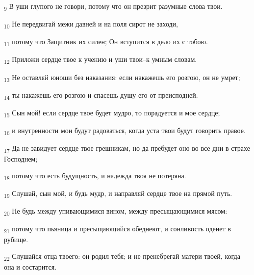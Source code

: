 \begin{tcolorbox}
\textsubscript{9} В уши глупого не говори, потому что он презрит разумные слова твои.
\end{tcolorbox}
\begin{tcolorbox}
\textsubscript{10} Не передвигай межи давней и на поля сирот не заходи,
\end{tcolorbox}
\begin{tcolorbox}
\textsubscript{11} потому что Защитник их силен; Он вступится в дело их с тобою.
\end{tcolorbox}
\begin{tcolorbox}
\textsubscript{12} Приложи сердце твое к учению и уши твои--к умным словам.
\end{tcolorbox}
\begin{tcolorbox}
\textsubscript{13} Не оставляй юноши без наказания: если накажешь его розгою, он не умрет;
\end{tcolorbox}
\begin{tcolorbox}
\textsubscript{14} ты накажешь его розгою и спасешь душу его от преисподней.
\end{tcolorbox}
\begin{tcolorbox}
\textsubscript{15} Сын мой! если сердце твое будет мудро, то порадуется и мое сердце;
\end{tcolorbox}
\begin{tcolorbox}
\textsubscript{16} и внутренности мои будут радоваться, когда уста твои будут говорить правое.
\end{tcolorbox}
\begin{tcolorbox}
\textsubscript{17} Да не завидует сердце твое грешникам, но да пребудет оно во все дни в страхе Господнем;
\end{tcolorbox}
\begin{tcolorbox}
\textsubscript{18} потому что есть будущность, и надежда твоя не потеряна.
\end{tcolorbox}
\begin{tcolorbox}
\textsubscript{19} Слушай, сын мой, и будь мудр, и направляй сердце твое на прямой путь.
\end{tcolorbox}
\begin{tcolorbox}
\textsubscript{20} Не будь между упивающимися вином, между пресыщающимися мясом:
\end{tcolorbox}
\begin{tcolorbox}
\textsubscript{21} потому что пьяница и пресыщающийся обеднеют, и сонливость оденет в рубище.
\end{tcolorbox}
\begin{tcolorbox}
\textsubscript{22} Слушайся отца твоего: он родил тебя; и не пренебрегай матери твоей, когда она и состарится.
\end{tcolorbox}
